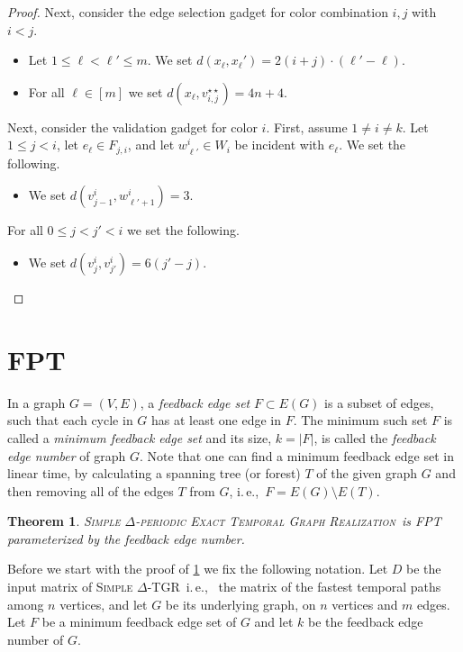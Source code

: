 \documentclass[11pt,a4paper]{article}
\newtheorem{theorem}{Theorem}
\theoremstyle{remark}
\theoremstyle{definition}
\newcommand{\ie}{i.\,e.,\ }
\newcommand{\deltaExactLong}{\textsc{Simple $\Delta$-periodic Exact Temporal Graph Realization}}
\newcommand{\deltaExact}{\textsc{Simple $\Delta$-TGR}}
\begin{document}
\begin{proof}
Next, consider the edge selection gadget for color combination $i,j$ with $i<j$.
\begin{itemize}
    \item Let $1\le \ell<\ell'\le m$. We set $d(x_\ell,x_\ell')=2(i+j)\cdot(\ell'-\ell)$.
    \item For all $\ell\in[m]$ we set $d(x_\ell,v_{i,j}^{\star\star})=4n+4$.
\end{itemize}

Next, consider the validation gadget for color $i$. First, assume $1\neq i \neq k$. Let $1\le j<i$, let $e_\ell\in F_{j,i}$, and let $w^i_{\ell'}\in W_i$ be incident with $e_\ell$. We set the following.
\begin{itemize}
    \item We set $d(v^i_{j-1},w^i_{\ell'+1})=3$.
\end{itemize}

For all $0\le j<j'<i$ we set the following.
\begin{itemize}
    \item We set $d(v^i_j,v^i_{j'})=6(j'-j)$.
\end{itemize}
\end{proof}

\section{FPT}
In a graph $G=(V,E)$, a \emph{feedback edge set} $F \subset E(G)$ is a subset of edges, such that each cycle in $G$ has at least one edge in $F$.
The minimum such set $F$ is called a  \emph{minimum feedback edge set} and its size, $k = |F|$, is called the \emph{feedback edge number} of graph $G$.
Note that one can find a minimum feedback edge set in linear time, by calculating a spanning tree (or forest) $T$ of the given graph $G$ and then removing all of the edges $T$ from $G$, \ie $F = E(G) \setminus E(T)$.

\begin{theorem}\label{thm:FPTwrtFES}
    \deltaExactLong\ is FPT parameterized by the feedback edge number.
\end{theorem}

Before we start with the proof of \cref{thm:FPTwrtFES} we fix the following notation. 
Let $D$ be the input matrix of \deltaExact\ \ie
the matrix of the fastest temporal paths among $n$ vertices, and let $G$ be its underlying graph, on $n$ vertices and $m$ edges.
Let $F$ be a minimum feedback edge set of $G$ and let $k$ be the feedback edge number of $G$.
\end{document}
